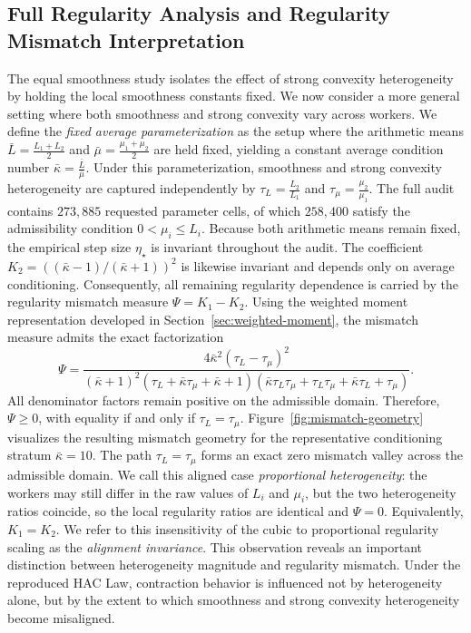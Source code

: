 \documentclass[mathematics,article,submit,moreauthors]{Definitions/mdpi}
\begin{document}
\subsection{Full Regularity Analysis and Regularity Mismatch Interpretation} 
The equal smoothness study isolates the effect of strong convexity heterogeneity by holding the local smoothness constants fixed. We now consider a more general setting where both smoothness and strong convexity vary across workers. We define the \emph{fixed average parameterization} as the setup where the arithmetic means $\bar{L} = \frac{L_1 + L_2}{2}$ and $\bar{\mu} = \frac{\mu_1 + \mu_2}{2}$ are held fixed, yielding a constant average condition number $\bar{\kappa} = \frac{\bar{L}}{\bar{\mu}}$. Under this parameterization, smoothness and strong convexity heterogeneity are captured independently by $\tau_L = \frac{L_2}{L_1}$ and $\tau_{\mu} = \frac{\mu_2}{\mu_1}$. The full audit contains \(273{,}885\) requested parameter cells, of which \(258{,}400\) satisfy the admissibility condition \(0<\mu_i\le L_i\). Because both arithmetic means remain fixed, the empirical step size \(\eta_\star\) is invariant throughout the audit. The coefficient \(K_2=((\bar{\kappa}-1)/(\bar{\kappa}+1))^2\) is likewise invariant and depends only on average conditioning. Consequently, all remaining regularity dependence is carried by the regularity mismatch measure \(\Psi=K_1-K_2\). Using the weighted moment representation developed in Section~\ref{sec:weighted-moment}, the mismatch measure admits the exact factorization \begin{equation} \Psi= \frac{ 4\bar{\kappa}^2(\tau_L-\tau_\mu)^2 }{ (\bar{\kappa}+1)^2 (\tau_L+\bar{\kappa}\tau_\mu+\bar{\kappa}+1) (\bar{\kappa}\tau_L\tau_\mu+\tau_L\tau_\mu+\bar{\kappa}\tau_L+\tau_\mu) }. \end{equation} All denominator factors remain positive on the admissible domain. Therefore, \(\Psi\ge0\), with equality if and only if \(\tau_L=\tau_\mu\). Figure~\ref{fig:mismatch-geometry} visualizes the resulting mismatch geometry for the representative conditioning stratum \(\bar{\kappa}=10\). The path \(\tau_L=\tau_\mu\) forms an exact zero mismatch valley across the admissible domain. We call this aligned case \emph{proportional heterogeneity}: the workers may still differ in the raw values of \(L_i\) and \(\mu_i\), but the two heterogeneity ratios coincide, so the local regularity ratios are identical and \(\Psi=0\). Equivalently, \(K_1=K_2\). We refer to this insensitivity of the cubic to proportional regularity scaling as the \emph{alignment invariance}. This observation reveals an important distinction between heterogeneity magnitude and regularity mismatch. Under the reproduced HAC Law, contraction behavior is influenced not by heterogeneity alone, but by the extent to which smoothness and strong convexity heterogeneity become misaligned.
\end{document}
